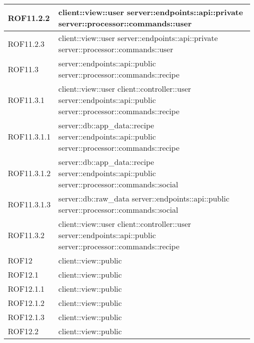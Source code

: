 \begin{center}
\begin{longtable}{| p{4cm} | p{8cm} |}
\hline
ROF11.2.2 & client::view::user \newline server::endpoints::api::private \newline server::processor::commands::user \\
\hline
ROF11.2.3 & client::view::user \newline server::endpoints::api::private \newline server::processor::commands::user \\
\hline
ROF11.3 & server::endpoints::api::public \newline server::processor::commands::recipe \\
\hline
ROF11.3.1 & client::view::user \newline client::controller::user \newline server::endpoints::api::public \newline server::processor::commands::recipe \\
\hline
ROF11.3.1.1 & server::db::app\_data::recipe \newline server::endpoints::api::public \newline server::processor::commands::recipe \\
\hline
ROF11.3.1.2 & server::db::app\_data::recipe \newline server::endpoints::api::public \newline server::processor::commands::social \\
\hline
ROF11.3.1.3 & server::db::raw\_data \newline server::endpoints::api::public \newline server::processor::commands::social \\
\hline
ROF11.3.2 & client::view::user \newline client::controller::user \newline server::endpoints::api::public \newline server::processor::commands::recipe \\
\hline
ROF12 & client::view::public \\
\hline
ROF12.1 & client::view::public \\
\hline
ROF12.1.1 & client::view::public \\
\hline
ROF12.1.2 & client::view::public \\
\hline
ROF12.1.3 & client::view::public \\
\hline
ROF12.2 & client::view::public \\
\hline


\end{longtable}
\egroup
\end{center}
